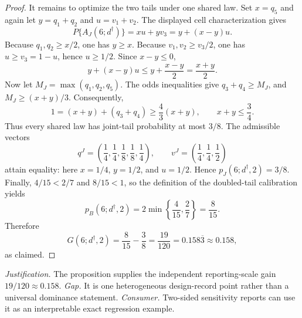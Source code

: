 \documentclass{article}
\begin{document}
\begin{proof}
It remains to optimize the two tails under one shared law. Set \(x=q_5\) and again let \(y=q_1+q_2\) and \(u=v_1+v_2\). The displayed cell characterization gives
\[P\{A_J(6;d^\dagger)\}=xu+yv_3=y+(x-y)u.\]
Because \(q_1,q_2\ge x/2\), one has \(y\ge x\). Because \(v_1,v_2\ge v_3/2\), one has \(u\ge v_3=1-u\), hence \(u\ge1/2\). Since \(x-y\le0\),
\[y+(x-y)u\le y+\frac{x-y}{2}=\frac{x+y}{2}.\]
Now let \(M_J=\max(q_1,q_2,q_5)\). The odds inequalities give \(q_3+q_4\ge M_J\), and \(M_J\ge(x+y)/3\). Consequently,
\[1=(x+y)+(q_3+q_4)\ge\frac43(x+y),\qquad x+y\le\frac34.\]
Thus every shared law has joint-tail probability at most \(3/8\). The admissible vectors
\[q^J=\left(\frac14,\frac14,\frac18,\frac18,\frac14\right),\qquad v^J=\left(\frac14,\frac14,\frac12\right)\]
attain equality: here \(x=1/4\), \(y=1/2\), and \(u=1/2\). Hence \(p_J(6;d^\dagger,2)=3/8\). Finally, \(4/15<2/7\) and \(8/15<1\), so the definition of the doubled-tail calibration yields
\[p_B(6;d^\dagger,2)=2\min\left\{\frac4{15},\frac27\right\}=\frac8{15}.\]
Therefore
\[G(6;d^\dagger,2)=\frac8{15}-\frac38=\frac{19}{120}=0.158\overline{3}\approx0.158,\]
as claimed.
\end{proof}
\par\smallskip\noindent \textit{Justification.} The proposition supplies the independent reporting-scale gain \(19/120\approx0.158\). \textit{Gap.} It is one heterogeneous design-record point rather than a universal dominance statement. \textit{Consumer.} Two-sided sensitivity reports can use it as an interpretable exact regression example.
\end{document}

